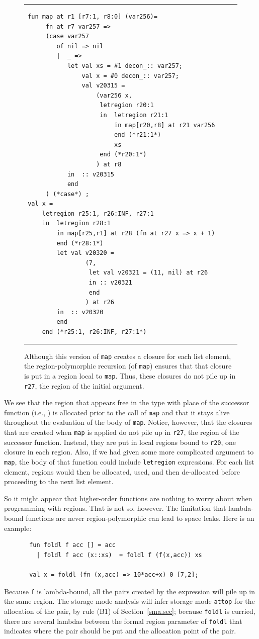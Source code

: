 \documentclass[12pt]{book}
\begin{document}
\begin{figure}
\hrule \medskip
\begin{verbatim}
 fun map at r1 [r7:1, r8:0] (var256)= 
      fn at r7 var257 => 
      (case var257 
         of nil => nil
         |  _ => 
            let val xs = #1 decon_:: var257; 
                val x = #0 decon_:: var257; 
                val v20315 = 
                    (var256 x, 
                     letregion r20:1 
                     in  letregion r21:1 
                         in map[r20,r8] at r21 var256 
                         end (*r21:1*) 
                         xs 
                     end (*r20:1*)
                    ) at r8
            in  :: v20315
            end 
      ) (*case*) ; 
 val x = 
     letregion r25:1, r26:INF, r27:1 
     in  letregion r28:1 
         in map[r25,r1] at r28 (fn at r27 x => x + 1) 
         end (*r28:1*) 
         let val v20320 = 
                 (7, 
                  let val v20321 = (11, nil) at r26 
                  in :: v20321 
                  end 
                 ) at r26
         in  :: v20320
         end  
     end (*r25:1, r26:INF, r27:1*)
\end{verbatim}
\caption{Although this version of {\tt map} creates a closure for
  each list element, the region-polymorphic recursion (of {\tt map})
  ensures that that closure is put in a region local to {\tt map}.
  Thus, these closures do not pile up in {\tt r27}, the region of the
  initial argument.} 
\medskip \hrule
\label{map.fig}
\end{figure}
We see that the region that appears free in the type with place of the successor
function (i.e., ) is allocated prior 
to the call of {\tt map} and that it stays
alive throughout the evaluation of the body of {\tt map}. Notice, however, that
the closures that are created when {\tt map} is applied do not pile up in
{\tt r27}, the region of the successor function. Instead, they are put
in local regions bound to {\tt r20}, one closure in each region. 
Also, if we had given some
more complicated argument to {\tt map}, the body of that function could include
{\tt letregion} expressions. For each list element, regions would then be
allocated, used, and then de-allocated before proceeding to the next list element.

So it might appear that higher-order functions are nothing to worry about when
programming with regions. That is not so, however. The limitation that lambda-bound
functions are never region-polymorphic can lead to space leaks. Here is an example:
\begin{verbatim}
       fun foldl f acc [] = acc
         | foldl f acc (x::xs)  = foldl f (f(x,acc)) xs

       val x = foldl (fn (x,acc) => 10*acc+x) 0 [7,2];
\end{verbatim}
Because {\tt f} is lambda-bound, all the pairs created by the expression 
will pile up in the same region. The storage mode analysis will infer storage mode {\tt attop}
for the allocation of the pair, by rule (B1) of Section~\ref{sma.sec}; because {\tt foldl} is
curried, 
there are several lambdas between the formal region parameter of {\tt foldl} that indicates
where the pair should be put and the allocation point of the pair.
\end{document}
